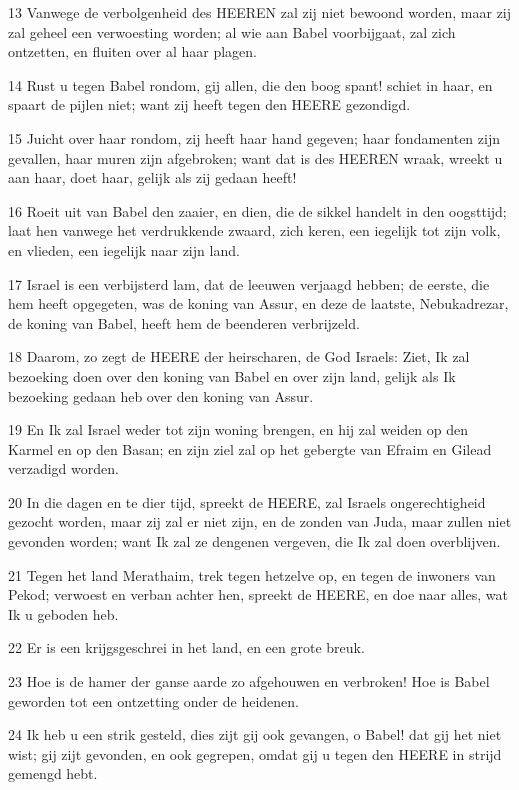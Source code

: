 \par 13 Vanwege de verbolgenheid des HEEREN zal zij niet bewoond worden, maar zij zal geheel een verwoesting worden; al wie aan Babel voorbijgaat, zal zich ontzetten, en fluiten over al haar plagen.
\par 14 Rust u tegen Babel rondom, gij allen, die den boog spant! schiet in haar, en spaart de pijlen niet; want zij heeft tegen den HEERE gezondigd.
\par 15 Juicht over haar rondom, zij heeft haar hand gegeven; haar fondamenten zijn gevallen, haar muren zijn afgebroken; want dat is des HEEREN wraak, wreekt u aan haar, doet haar, gelijk als zij gedaan heeft!
\par 16 Roeit uit van Babel den zaaier, en dien, die de sikkel handelt in den oogsttijd; laat hen vanwege het verdrukkende zwaard, zich keren, een iegelijk tot zijn volk, en vlieden, een iegelijk naar zijn land.
\par 17 Israel is een verbijsterd lam, dat de leeuwen verjaagd hebben; de eerste, die hem heeft opgegeten, was de koning van Assur, en deze de laatste, Nebukadrezar, de koning van Babel, heeft hem de beenderen verbrijzeld.
\par 18 Daarom, zo zegt de HEERE der heirscharen, de God Israels: Ziet, Ik zal bezoeking doen over den koning van Babel en over zijn land, gelijk als Ik bezoeking gedaan heb over den koning van Assur.
\par 19 En Ik zal Israel weder tot zijn woning brengen, en hij zal weiden op den Karmel en op den Basan; en zijn ziel zal op het gebergte van Efraim en Gilead verzadigd worden.
\par 20 In die dagen en te dier tijd, spreekt de HEERE, zal Israels ongerechtigheid gezocht worden, maar zij zal er niet zijn, en de zonden van Juda, maar zullen niet gevonden worden; want Ik zal ze dengenen vergeven, die Ik zal doen overblijven.
\par 21 Tegen het land Merathaim, trek tegen hetzelve op, en tegen de inwoners van Pekod; verwoest en verban achter hen, spreekt de HEERE, en doe naar alles, wat Ik u geboden heb.
\par 22 Er is een krijgsgeschrei in het land, en een grote breuk.
\par 23 Hoe is de hamer der ganse aarde zo afgehouwen en verbroken! Hoe is Babel geworden tot een ontzetting onder de heidenen.
\par 24 Ik heb u een strik gesteld, dies zijt gij ook gevangen, o Babel! dat gij het niet wist; gij zijt gevonden, en ook gegrepen, omdat gij u tegen den HEERE in strijd gemengd hebt.
